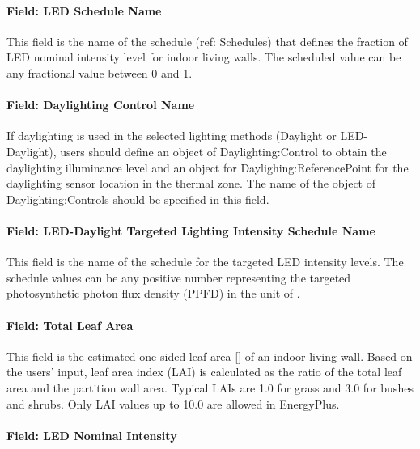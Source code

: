 \paragraph{Field: LED Schedule Name}\label{field-LED-schedule-name-indoorlivingwall}

This field is the name of the schedule (ref: Schedules) that defines the fraction of LED nominal intensity level for indoor living walls. The scheduled value can be any fractional value between 0 and 1.

\paragraph{Field: Daylighting Control Name}\label{field-daylighting-control-name-indoorlivingwall}

If daylighting is used in the selected lighting methods (Daylight or LED-Daylight), users should define an object of Daylighting:Control to obtain the daylighting illuminance level and an object for Daylighing:ReferencePoint for the daylighting sensor location in the thermal zone. The name of the object of Daylighting:Controls should be specified in this field.

\paragraph{Field: LED-Daylight Targeted Lighting Intensity Schedule Name}\label{field-led-daylight-targeted-lighting-intensity-schedule-name-indoorlivingwall}

This field is the name of the schedule for the targeted LED intensity levels. The schedule values can be any positive number representing the targeted photosynthetic photon flux density (PPFD) in the unit of \si{\umolperAreaperSecond}.

\paragraph{Field: Total Leaf Area}\label{field-total-leaf-area-indoorlivingwall}

This field is the estimated one-sided leaf area {[}\si{\area}{]} of an indoor living wall. Based on the users’ input, leaf area index (LAI) is calculated as the ratio of the total leaf area and the partition wall area. Typical LAIs are 1.0 for grass and 3.0 for bushes and shrubs. Only LAI values up to 10.0 are allowed in EnergyPlus.

\paragraph{Field: LED Nominal Intensity}\label{field-led-nominal-intensity-indoorlivingwall}

